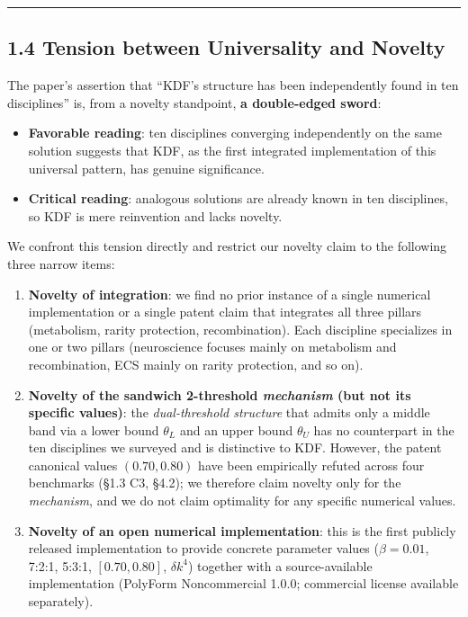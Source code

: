 \begin{center}\rule{0.5\linewidth}{0.5pt}\end{center}

\subsection{1.4 Tension between Universality and Novelty}\label{tension-between-universality-and-novelty}

The paper's assertion that ``KDF's structure has been independently found in ten disciplines'' is, from a novelty standpoint, \textbf{a double-edged sword}:

\begin{itemize}
\tightlist
\item
  \textbf{Favorable reading}: ten disciplines converging independently on the same solution suggests that KDF, as the first integrated implementation of this universal pattern, has genuine significance.
\item
  \textbf{Critical reading}: analogous solutions are already known in ten disciplines, so KDF is mere reinvention and lacks novelty.
\end{itemize}

We confront this tension directly and restrict our novelty claim to the following three narrow items:

\begin{enumerate}
\def\labelenumi{\arabic{enumi}.}
\tightlist
\item
  \textbf{Novelty of integration}: we find no prior instance of a single numerical implementation or a single patent claim that integrates all three pillars (metabolism, rarity protection, recombination). Each discipline specializes in one or two pillars (neuroscience focuses mainly on metabolism and recombination, ECS mainly on rarity protection, and so on).
\item
  \textbf{Novelty of the sandwich 2-threshold \emph{mechanism} (but not its specific values)}: the \emph{dual-threshold structure} that admits only a middle band via a lower bound \(\theta_L\) and an upper bound \(\theta_U\) has no counterpart in the ten disciplines we surveyed and is distinctive to KDF. However, the patent canonical values \((0.70, 0.80)\) have been empirically refuted across four benchmarks (§1.3 C3, §4.2); we therefore claim novelty only for the \emph{mechanism}, and we do not claim optimality for any specific numerical values.
\item
  \textbf{Novelty of an open numerical implementation}: this is the first publicly released implementation to provide concrete parameter values (\(\beta = 0.01\), 7:2:1, 5:3:1, \([0.70, 0.80]\), \(\delta k^4\)) together with a source-available implementation (PolyForm Noncommercial 1.0.0; commercial license available separately).
\end{enumerate}

